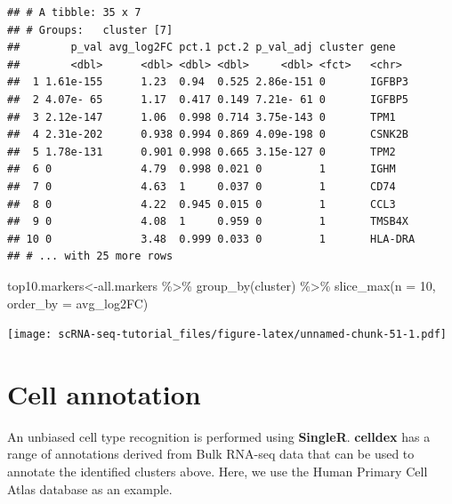 \documentclass[
]{book}
\newenvironment{Shaded}{\begin{snugshade}}{\end{snugshade}}
\newcommand{\AttributeTok}[1]{\textcolor[rgb]{0.77,0.63,0.00}{#1}}
\newcommand{\DecValTok}[1]{\textcolor[rgb]{0.00,0.00,0.81}{#1}}
\newcommand{\FunctionTok}[1]{\textcolor[rgb]{0.00,0.00,0.00}{#1}}
\newcommand{\NormalTok}[1]{#1}
\newcommand{\OtherTok}[1]{\textcolor[rgb]{0.56,0.35,0.01}{#1}}
\newcommand{\SpecialCharTok}[1]{\textcolor[rgb]{0.00,0.00,0.00}{#1}}
\begin{document}
\begin{verbatim}
## # A tibble: 35 x 7
## # Groups:   cluster [7]
##        p_val avg_log2FC pct.1 pct.2 p_val_adj cluster gene   
##        <dbl>      <dbl> <dbl> <dbl>     <dbl> <fct>   <chr>  
##  1 1.61e-155      1.23  0.94  0.525 2.86e-151 0       IGFBP3 
##  2 4.07e- 65      1.17  0.417 0.149 7.21e- 61 0       IGFBP5 
##  3 2.12e-147      1.06  0.998 0.714 3.75e-143 0       TPM1   
##  4 2.31e-202      0.938 0.994 0.869 4.09e-198 0       CSNK2B 
##  5 1.78e-131      0.901 0.998 0.665 3.15e-127 0       TPM2   
##  6 0              4.79  0.998 0.021 0         1       IGHM   
##  7 0              4.63  1     0.037 0         1       CD74   
##  8 0              4.22  0.945 0.015 0         1       CCL3   
##  9 0              4.08  1     0.959 0         1       TMSB4X 
## 10 0              3.48  0.999 0.033 0         1       HLA-DRA
## # ... with 25 more rows
\end{verbatim}

\begin{Shaded}
\begin{Highlighting}[]
\NormalTok{top10.markers}\OtherTok{\textless{}{-}}\NormalTok{all.markers }\SpecialCharTok{\%\textgreater{}\%}
    \FunctionTok{group\_by}\NormalTok{(cluster) }\SpecialCharTok{\%\textgreater{}\%}
    \FunctionTok{slice\_max}\NormalTok{(}\AttributeTok{n =} \DecValTok{10}\NormalTok{, }\AttributeTok{order\_by =}\NormalTok{ avg\_log2FC)}
\end{Highlighting}
\end{Shaded}

\begin{Shaded}
\end{Shaded}

\texttt{[image: scRNA-seq-tutorial\_files/figure-latex/unnamed-chunk-51-1.pdf]}

\hypertarget{cell-annotation}{%
\section{Cell annotation}\label{cell-annotation}}

An unbiased cell type recognition is performed using \textbf{SingleR}. \textbf{celldex} has a range of annotations derived from Bulk RNA-seq data that can be used to annotate the identified clusters above. Here, we use the Human Primary Cell Atlas database as an example.
\end{document}
